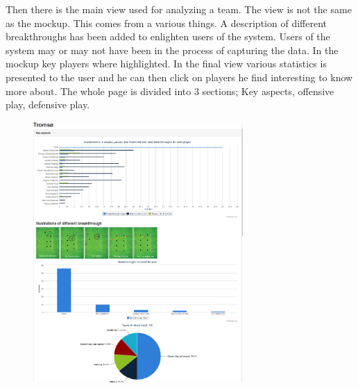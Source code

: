 Then there is the main view used for analyzing a team. The view is not the same as the mockup. This comes from a various things. A description of different breakthroughs has been added to enlighten users of the system. Users of the system may or may not have been in the process of capturing the data. In the mockup key players where highlighted. In the final view various statistics is presented to the user and he can then click on players he find interesting to know more about.  The whole page is divided into 3 sections; Key aspects, offensive play, defensive play.

\begin{figure}[ht!]
\centering
\includegraphics[width=80mm]{images/general/team_analysis1.png}

\end{figure}
